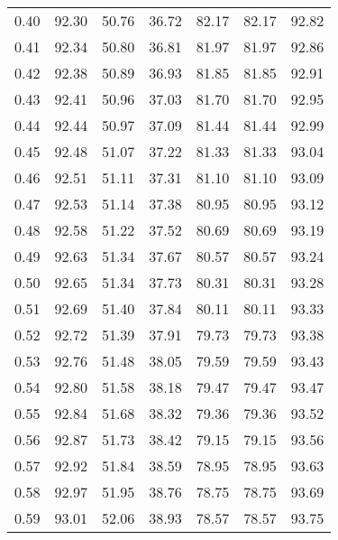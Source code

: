 \begin{tabular}{|c|c|c|c|c|c|c|}
      0.40 &     92.30 &     50.76 &      36.72 &   82.17 &      82.17 &         92.82 \\
      0.41 &     92.34 &     50.80 &      36.81 &   81.97 &      81.97 &         92.86 \\
      0.42 &     92.38 &     50.89 &      36.93 &   81.85 &      81.85 &         92.91 \\
      0.43 &     92.41 &     50.96 &      37.03 &   81.70 &      81.70 &         92.95 \\
      0.44 &     92.44 &     50.97 &      37.09 &   81.44 &      81.44 &         92.99 \\
      0.45 &     92.48 &     51.07 &      37.22 &   81.33 &      81.33 &         93.04 \\
      0.46 &     92.51 &     51.11 &      37.31 &   81.10 &      81.10 &         93.09 \\
      0.47 &     92.53 &     51.14 &      37.38 &   80.95 &      80.95 &         93.12 \\
      0.48 &     92.58 &     51.22 &      37.52 &   80.69 &      80.69 &         93.19 \\
      0.49 &     92.63 &     51.34 &      37.67 &   80.57 &      80.57 &         93.24 \\
      0.50 &     92.65 &     51.34 &      37.73 &   80.31 &      80.31 &         93.28 \\
      0.51 &     92.69 &     51.40 &      37.84 &   80.11 &      80.11 &         93.33 \\
      0.52 &     92.72 &     51.39 &      37.91 &   79.73 &      79.73 &         93.38 \\
      0.53 &     92.76 &     51.48 &      38.05 &   79.59 &      79.59 &         93.43 \\
      0.54 &     92.80 &     51.58 &      38.18 &   79.47 &      79.47 &         93.47 \\
      0.55 &     92.84 &     51.68 &      38.32 &   79.36 &      79.36 &         93.52 \\
      0.56 &     92.87 &     51.73 &      38.42 &   79.15 &      79.15 &         93.56 \\
      0.57 &     92.92 &     51.84 &      38.59 &   78.95 &      78.95 &         93.63 \\
      0.58 &     92.97 &     51.95 &      38.76 &   78.75 &      78.75 &         93.69 \\
      0.59 &     93.01 &     52.06 &      38.93 &   78.57 &      78.57 &         93.75 \\

\end{tabular}
